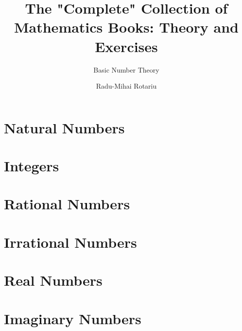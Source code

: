 \documentclass[a4paper]{book}
\title{The "Complete" Collection of Mathematics Books: Theory and Exercises}
\subtitle{Basic Number Theory}
\author{Radu-Mihai Rotariu}
\begin{document}
\maketitle

\tableofcontents

\chapter{Natural Numbers}

\chapter{Integers}

\chapter{Rational Numbers}

\chapter{Irrational Numbers}

\chapter{Real Numbers}

\chapter{Imaginary Numbers}
\end{document}
